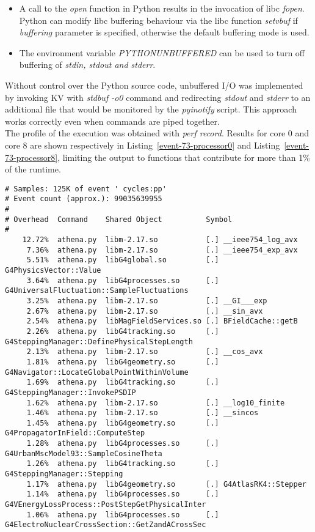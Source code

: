 \documentclass[a4paper]{jpconf}
\begin{document}
\begin{itemize}
\item A call to the \textit{open} function in Python results in the invocation
of libc \textit{fopen}. Python can modify libc buffering behaviour via the libc
function \textit{setvbuf} if \textit{buffering} parameter is specified,
otherwise the default buffering mode is used.
\item The environment variable \textit{PYTHONUNBUFFERED} can be used to turn off
buffering of \textit{stdin, stdout and stderr}.
\end{itemize}
Without control over the Python source code, unbuffered I/O was implemented by 
invoking KV with \textit{stdbuf -o0} command and redirecting \textit{stdout} and \textit{stderr}
to an additional file that would be monitored by the \textit{pyinotify} script. This approach 
works correctly even when commands are piped together.
\\
The profile of the execution was obtained with \textit{perf record}.
Results for core 0
and core 8 are shown respectively in Listing~\ref{event-73-processor0} and
Listing~\ref{event-73-processor8}, limiting the output to functions that
contribute for more than 1\% of the runtime.

\begin{lstlisting}[caption=Recording of event 73 on core 0., label=event-73-processor0]
# Samples: 125K of event ' cycles:pp'
# Event count (approx.): 99035639955
#
# Overhead  Command    Shared Object          Symbol
#
    12.72%  athena.py  libm-2.17.so           [.] __ieee754_log_avx
     7.36%  athena.py  libm-2.17.so           [.] __ieee754_exp_avx
     5.51%  athena.py  libG4global.so         [.] G4PhysicsVector::Value
     3.64%  athena.py  libG4processes.so      [.] G4UniversalFluctuation::SampleFluctuations
     3.25%  athena.py  libm-2.17.so           [.] __GI___exp
     2.67%  athena.py  libm-2.17.so           [.] __sin_avx
     2.54%  athena.py  libMagFieldServices.so [.] BFieldCache::getB
     2.26%  athena.py  libG4tracking.so       [.] G4SteppingManager::DefinePhysicalStepLength
     2.13%  athena.py  libm-2.17.so           [.] __cos_avx
     1.81%  athena.py  libG4geometry.so       [.] G4Navigator::LocateGlobalPointWithinVolume
     1.69%  athena.py  libG4tracking.so       [.] G4SteppingManager::InvokePSDIP
     1.62%  athena.py  libm-2.17.so           [.] __log10_finite
     1.46%  athena.py  libm-2.17.so           [.] __sincos
     1.45%  athena.py  libG4geometry.so       [.] G4PropagatorInField::ComputeStep
     1.28%  athena.py  libG4processes.so      [.] G4UrbanMscModel93::SampleCosineTheta
     1.26%  athena.py  libG4tracking.so       [.] G4SteppingManager::Stepping
     1.17%  athena.py  libG4geometry.so       [.] G4AtlasRK4::Stepper
     1.14%  athena.py  libG4processes.so      [.] G4VEnergyLossProcess::PostStepGetPhysicalInter
     1.06%  athena.py  libG4processes.so      [.] G4ElectroNuclearCrossSection::GetZandACrossSec
\end{lstlisting}
\end{document}
